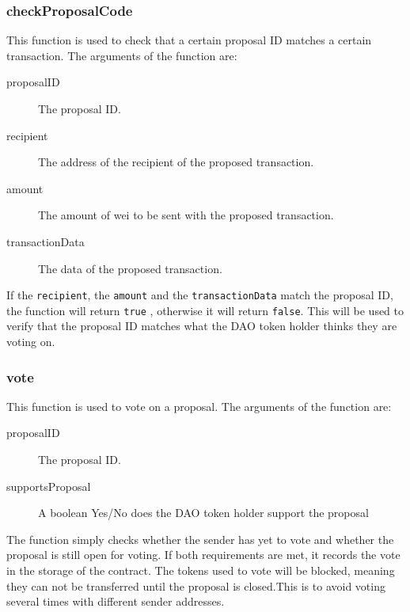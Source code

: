 \documentclass[9pt,oneside]{amsart}
\begin{document}
\begin{multicols}{2}
\subsubsection*{checkProposalCode}
This function is used to check that a certain proposal ID matches a certain transaction.
The arguments of the function are:
\begin{description}
 \item[proposalID] The proposal ID.
 \item[recipient] The address of the recipient of the proposed transaction.
 \item[amount] The amount of wei to be sent with the proposed transaction.
 \item[transactionData] The data of the proposed transaction.
\end{description}
If the \verb|recipient|,  the \verb|amount| and the \verb|transactionData| match the proposal ID, the function will return \verb|true| , otherwise it will return \verb|false|. This will be used to verify that the proposal ID matches what the DAO token holder thinks they are voting on.

\subsubsection*{vote}
This function is used to vote on a proposal. The arguments of the function are:
\begin{description}
 \item[proposalID] The proposal ID.
 \item[supportsProposal]  A boolean Yes/No does the DAO token holder support the proposal
\end{description}
The function simply checks whether the sender has yet to vote and whether the proposal is still open for voting. If both requirements are met, it records the vote in the storage of the contract. The tokens used to vote will be blocked, meaning they can not be transferred until the proposal is closed.This is to avoid voting several times with different sender addresses.


\end{multicols}
\end{document}
